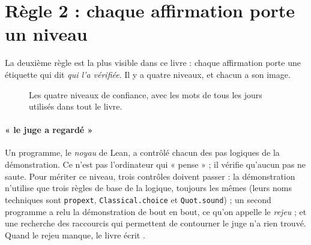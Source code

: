 \section{Règle 2 : chaque affirmation porte un niveau}

La deuxième règle est la plus visible dans ce livre : chaque affirmation porte une étiquette qui dit \emph{qui l'a
vérifiée}. Il y a quatre niveaux, et chacun a son image.

\begin{figure}[htbp]
\centering
{}
\caption{Les quatre niveaux de confiance, avec les mots de tous les jours utilisés dans tout le livre.}
\label{fig:niveaux}
\end{figure}

\paragraph{ « le juge a regardé »} Un programme, le \emph{noyau} de Lean, a contrôlé chacun des pas logiques
de la démonstration. Ce n'est pas l'ordinateur qui « pense » ; il vérifie qu'aucun pas ne saute. Pour mériter ce
niveau, trois contrôles doivent passer : la démonstration n'utilise que trois règles de base de la logique, toujours
les mêmes (leurs noms techniques sont \texttt{propext}, \texttt{Classical.choice} et \texttt{Quot.sound}) ; un
second programme a relu la démonstration de bout en bout, ce qu'on appelle le \emph{rejeu} ; et une recherche des
raccourcis qui permettent de contourner le juge n'a rien trouvé. Quand le rejeu manque, le livre écrit
.

